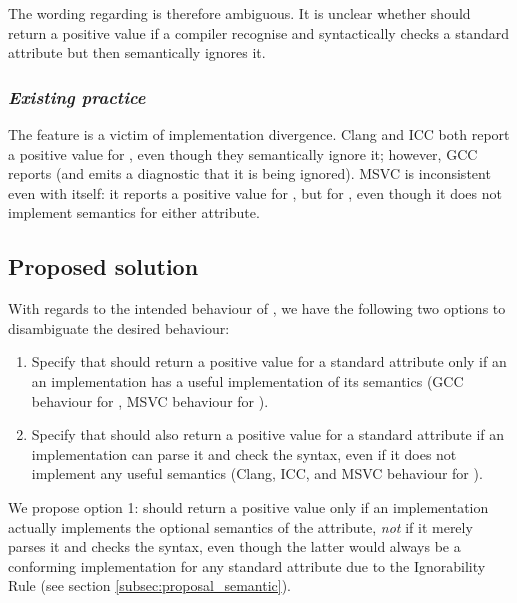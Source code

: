 The wording regarding \mbox{} is therefore ambiguous. It is unclear whether \mbox{} should return a positive value if a compiler recognise and syntactically checks a standard attribute but then semantically ignores it. 

\subsubsection*{\emph{Existing practice}}

The \mbox{} feature is a victim of implementation divergence. Clang and ICC both report a positive value for \mbox{}, even though they semantically ignore it; however, GCC reports  (and emits a diagnostic that it is being ignored). MSVC is inconsistent even with itself: it reports a positive value for \mbox{}, but  for \mbox{}, even though it does not implement semantics for either attribute.

\subsection{Proposed solution}

With regards to the intended behaviour of , we have the following two options to disambiguate the desired behaviour:
\begin{enumerate}
\item Specify that  should return a positive value for a standard attribute only if an an implementation has a useful implementation of its semantics (GCC behaviour for , MSVC behaviour for ).
\item Specify that  should also return a positive value for a standard attribute if an implementation can parse it and check the syntax, even if it does not implement any useful semantics (Clang, ICC, and MSVC behaviour for ).
\end{enumerate}
We propose option 1:  should return a positive value only if an implementation actually implements the optional semantics of the attribute, \emph{not} if it merely parses it and checks the syntax, even though the latter would always be a conforming implementation for any standard attribute due to the Ignorability Rule (see section \ref{subsec:proposal_semantic}).

